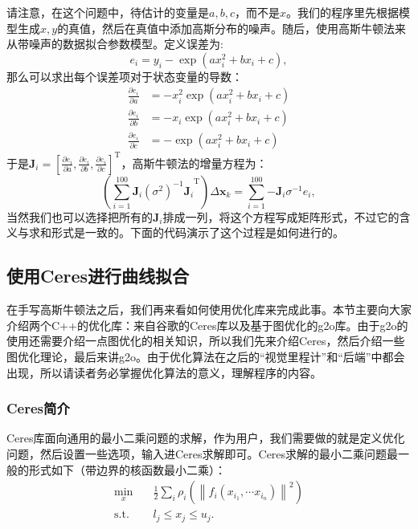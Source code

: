 请注意，在这个问题中，待估计的变量是$a,b,c$，而不是$x$。我们的程序里先根据模型生成$x,y$的真值，然后在真值中添加高斯分布的噪声。随后，使用高斯牛顿法来从带噪声的数据拟合参数模型。定义误差为:
\begin{equation}
e_i = y_i - \exp \left( {ax_i^2 + bx_i + c} \right),
\end{equation}
那么可以求出每个误差项对于状态变量的导数：
\begin{equation}
\begin{aligned}
\frac{{\partial {e_i}}}{{\partial a}} &=  - x_i^2\exp \left( {ax_i^2 + b{x_i} + c} \right)\\
\frac{{\partial e_i}}{{\partial b}} &=  - {x_i}\exp \left( {ax_i^2 + b{x_i} + c} \right)\\
\frac{{\partial {e_i}}}{{\partial c}} &=  - \exp \left( {ax_i^2 + b{x_i} + c} \right)
\end{aligned}
\end{equation}
于是$\bm{J}_i = \left[\frac{{\partial {e_i}}}{{\partial a}},\frac{{\partial {e_i}}}{{\partial b}},\frac{{\partial {e_i}}}{{\partial c}} \right]^\mathrm{T}$，高斯牛顿法的增量方程为：
\begin{equation}
\left(\sum\limits_{i = 1}^{100} {\bm{J}_i{(\sigma^2)^{ - 1}}{\bm{J}_i}}^\mathrm{T} \right) \Delta \bm{x}_k = \sum\limits_{i = 1}^{100} { - {\bm{J}_i}{\sigma ^{ - 1}}{e_i}},
\end{equation}
当然我们也可以选择把所有的$\bm{J}_i$排成一列，将这个方程写成矩阵形式，不过它的含义与求和形式是一致的。下面的代码演示了这个过程是如何进行的。






\subsection{使用Ceres进行曲线拟合}
在手写高斯牛顿法之后，我们再来看如何使用优化库来完成此事。本节主要向大家介绍两个C++的优化库：来自谷歌的Ceres库\textsuperscript{\cite{Ceres}}以及基于图优化的g2o库\textsuperscript{\cite{Kummerle2011}}。由于g2o的使用还需要介绍一点图优化的相关知识，所以我们先来介绍Ceres，然后介绍一些图优化理论，最后来讲g2o。由于优化算法在之后的“视觉里程计”和“后端”中都会出现，所以请读者务必掌握优化算法的意义，理解程序的内容。

\subsubsection{Ceres简介}
Ceres库面向通用的最小二乘问题的求解，作为用户，我们需要做的就是定义优化问题，然后设置一些选项，输入进Ceres求解即可。Ceres求解的最小二乘问题最一般的形式如下（带边界的核函数最小二乘）：
\begin{equation}
\begin{array}{ll}
\min \limits_x \quad & \frac{1}{2}\sum\limits_i {{\rho _i}\left( {{{\left\| {{f_i}\left( {{x_{{i_1}}}, \cdots {x_{{i_n}}}} \right)} \right\|}^2}} \right)} \\
\mathrm{s.t.} \quad & {l_j} \leqslant {x_j} \leqslant {u_j}.
\end{array}
\end{equation}

